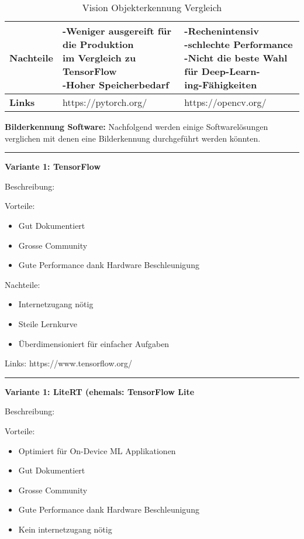 \begin{table}[H]
\begin{tabularx}{\textwidth}{|l|X|X|}
  \hline
  \textbf{Nachteile} & \makecell{-Weniger ausgereift für die Produktion \\ im Vergleich zu TensorFlow \\ -Hoher Speicherbedarf} & \makecell{-Rechenintensiv \\ -schlechte Performance \\ -Nicht die beste Wahl für Deep-Learn-\\ing-Fähigkeiten} \\
  \hline
  \textbf{Links} & https://pytorch.org/ & https://opencv.org/ \\
  \hline
\end{tabularx}
\caption{Vision Objekterkennung Vergleich}
\label{table:vision-object-detection-compare}
\end{table}

\textbf{Bilderkennung Software:} Nachfolgend werden einige Softwarelösungen verglichen mit denen eine Bilderkennung durchgeführt werden könnten.

\vspace{10pt}
\hrule
\textbf{Variante 1: TensorFlow}

Beschreibung:

Vorteile:
\begin{itemize}
    \item Gut Dokumentiert
    \item Grosse Community
    \item Gute Performance dank Hardware Beschleunigung
\end{itemize}


Nachteile:
\begin{itemize}
    \item Internetzugang nötig
    \item Steile Lernkurve
    \item Überdimensioniert für einfacher Aufgaben
\end{itemize}

Links: https://www.tensorflow.org/

\vspace{5pt}
\hrule

\textbf{Variante 1: LiteRT (ehemals: TensorFlow Lite}

Beschreibung:

Vorteile:
\begin{itemize}
    \item Optimiert für On-Device ML Applikationen
    \item Gut Dokumentiert
    \item Grosse Community
    \item Gute Performance dank Hardware Beschleunigung
    \item Kein internetzugang nötig
\end{itemize}


